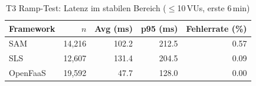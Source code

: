 
\begin{table}[htbp]
  \centering
  \caption{T3 Ramp-Test: Latenz im stabilen Bereich ($\leq$10\,VUs, erste 6\,min)}
  \label{tab:t3_stabil}
  \begin{tabular}{lrrrr}
    \toprule
    Framework & $n$ & Avg (ms) & p95 (ms) & Fehlerrate (\%) \\
    \midrule
    SAM & 14,216 & 102.2 & 212.5 & 0.57 \\
    SLS & 12,607 & 131.4 & 204.5 & 0.09 \\
    OpenFaaS & 19,592 & 47.7 & 128.0 & 0.00 \\
    \bottomrule
  \end{tabular}
\end{table}
